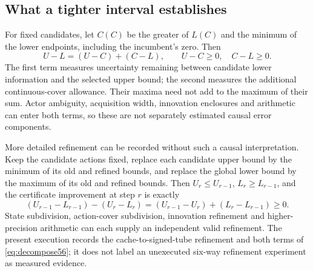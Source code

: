 \subsection{What a tighter interval establishes}
For fixed candidates, let $C(C)$ be the greater of $L(C)$ and the minimum of the lower endpoints, including the incumbent's zero. Then
\begin{equation}\label{eq:decompose56}
 U-L=(U-C)+(C-L),\qquad U-C\ge0,\quad C-L\ge0.
\end{equation}
The first term measures uncertainty remaining between candidate lower information and the selected upper bound; the second measures the additional continuous-cover allowance. Their maxima need not add to the maximum of their sum. Actor ambiguity, acquisition width, innovation enclosures and arithmetic can enter both terms, so these are not separately estimated causal error components.

More detailed refinement can be recorded without such a causal interpretation. Keep the candidate actions fixed, replace each candidate upper bound by the minimum of its old and refined bounds, and replace the global lower bound by the maximum of its old and refined bounds. Then $U_r\le U_{r-1}$, $L_r\ge L_{r-1}$, and the certificate improvement at step $r$ is exactly
\[
 (U_{r-1}-L_{r-1})-(U_r-L_r)
 =(U_{r-1}-U_r)+(L_r-L_{r-1})\ge0.
\]
State subdivision, action-cover subdivision, innovation refinement and higher-precision arithmetic can each supply an independent valid refinement. The present execution records the cache-to-signed-tube refinement and both terms of \eqref{eq:decompose56}; it does not label an unexecuted six-way refinement experiment as measured evidence.
